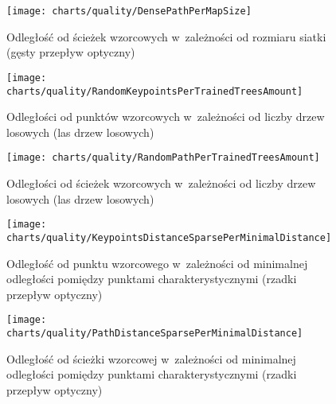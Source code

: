       \begin{figure}[!ht]
        \centering
        \texttt{[image: charts/quality/DensePathPerMapSize]}
        \caption[Odległość od ścieżek wzorcowych w~zależności od rozmiaru siatki]
                {Odległość od ścieżek wzorcowych w~zależności od rozmiaru siatki (gęsty przepływ optyczny)}
        \label{fig:DensePathPerMapSize}
      \end{figure}

      \begin{figure}[!ht]
        \centering
        \texttt{[image: charts/quality/RandomKeypointsPerTrainedTreesAmount]}
        \caption[Odległości od punktów wzorcowych w~zależności od liczby drzew losowych]
                {Odległości od punktów wzorcowych w~zależności od liczby drzew losowych (las drzew losowych)}
        \label{fig:RandomKeypointsPerTrainedTreesAmount}
      \end{figure}

      \begin{figure}[!ht]
        \centering
        \texttt{[image: charts/quality/RandomPathPerTrainedTreesAmount]}
        \caption[Odległości od ścieżek wzorcowych w~zależności od liczby drzew losowych]
                {Odległości od ścieżek wzorcowych w~zależności od liczby drzew losowych (las drzew losowych)}
        \label{fig:RandomPathPerTrainedTreesAmount}
      \end{figure}


      \begin{figure}[!ht]
        \centering
        \texttt{[image: charts/quality/KeypointsDistanceSparsePerMinimalDistance]}
        \caption[Odległość od punktu wzorcowego w~zależności od minimalnej odległości pomiędzy punktami
                 charakterystycznymi]
                {Odległość od punktu wzorcowego w~zależności od minimalnej odległości pomiędzy punktami
                 charakterystycznymi (rzadki przepływ optyczny)}
        \label{fig:SpecialisedSparseKeypointsDistance}
      \end{figure}

      \begin{figure}[!ht]
        \centering
        \texttt{[image: charts/quality/PathDistanceSparsePerMinimalDistance]}
        \caption[Odległość od ścieżki wzorcowej w~zależności od minimalnej odległości pomiędzy punktami
                 charakterystycznymi]
                {Odległość od ścieżki wzorcowej w~zależności od minimalnej odległości pomiędzy punktami
                 charakterystycznymi (rzadki przepływ optyczny)}
        \label{fig:SpecialisedSparsePathDistance}
      \end{figure}

